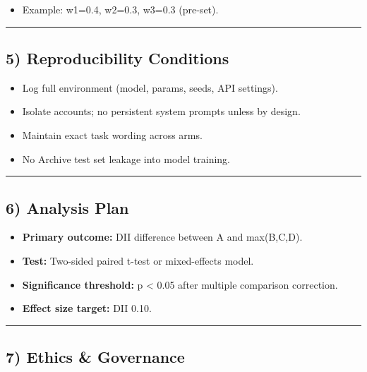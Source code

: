 \documentclass{article}
\begin{document}
\begin{itemize}
\tightlist
\item
  Example: w1=0.4, w2=0.3, w3=0.3 (pre-set).
\end{itemize}

\begin{center}\rule{0.5\linewidth}{0.5pt}\end{center}

\subsection*{5) Reproducibility Conditions}\label{reproducibility-conditions}

\begin{itemize}
\item
  Log full environment (model, params, seeds, API settings).
\item
  Isolate accounts; no persistent system prompts unless by design.
\item
  Maintain exact task wording across arms.
\item
  No Archive test set leakage into model training.
\end{itemize}

\begin{center}\rule{0.5\linewidth}{0.5pt}\end{center}

\subsection*{6) Analysis Plan}\label{analysis-plan}

\begin{itemize}
\item
  \textbf{Primary outcome:} DII difference between A and max(B,C,D).
\item
  \textbf{Test:} Two-sided paired t-test or mixed-effects model.
\item
  \textbf{Significance threshold:} p \textless{} 0.05 after multiple comparison correction.
\item
  \textbf{Effect size target:} DII 0.10.
\end{itemize}

\begin{center}\rule{0.5\linewidth}{0.5pt}\end{center}

\subsection*{7) Ethics \& Governance}\label{ethics-governance}
\end{document}
